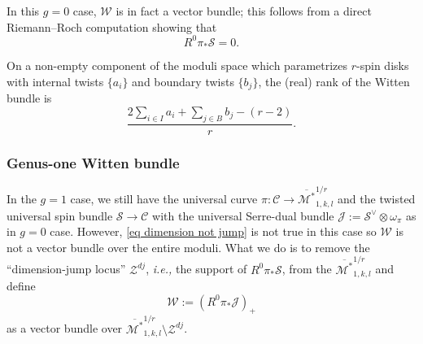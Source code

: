 \documentclass[11pt]{amsart}
\theoremstyle{definition}
\theoremstyle{remark}
\newcommand{\<}{\left<}
\renewcommand{\>}{\right>}
\numberwithin{equation}{section}
\def\Mbarstar{{\overline{\mathcal M^*}}}
\begin{document}
In this $g=0$ case, $\mathcal W$ is in fact a %
vector bundle; this %
follows from a direct Riemann--Roch computation showing that 
\begin{equation}\label{eq dimension not jump}
    R^0\pi_*\mathcal{S}=0.
\end{equation}




 On a non-empty component of the moduli space which parametrizes $r$-spin disks with internal twists $\{a_i\}$ and boundary twists $\{b_j\}$, the (real) rank of the Witten bundle is
\begin{equation}\label{eq rank of witten bundle}\frac{2 \sum_{i\in I} a_i + \sum_{j\in B} b_j - (r-2)}{r}.\end{equation}


\subsubsection{Genus-one Witten bundle}
In the $g=1$ case, we still have  the universal curve $\pi: \mathcal{C} \to \Mbarstar_{1,k,l}^{1/r}$ and the twisted universal spin bundle $\mathcal{S} \to \mathcal{C}$   with the universal Serre-dual bundle 
$\mathcal{J}:= \mathcal{S}^{\vee} \otimes \omega_{\pi}$
as in $g=0$ case. However,
\eqref{eq dimension not jump} is not true in this case so $\mathcal W$ is not a vector bundle over the entire moduli. What we do is to remove the ``dimension-jump locus'' $\mathcal Z^{dj}$, \textit{i.e.,} the support of $R^0\pi_*\mathcal S$,  from the %
$\Mbarstar_{1,k,l}^{1/r}$ and %
define 
\begin{equation*}
{\mathcal{W}}:= (R^0\pi_*\mathcal{J})_+
\end{equation*}
as %
a vector bundle over $\Mbarstar_{1,k,l}^{1/r}\setminus \mathcal Z^{dj}$. 
\end{document}

